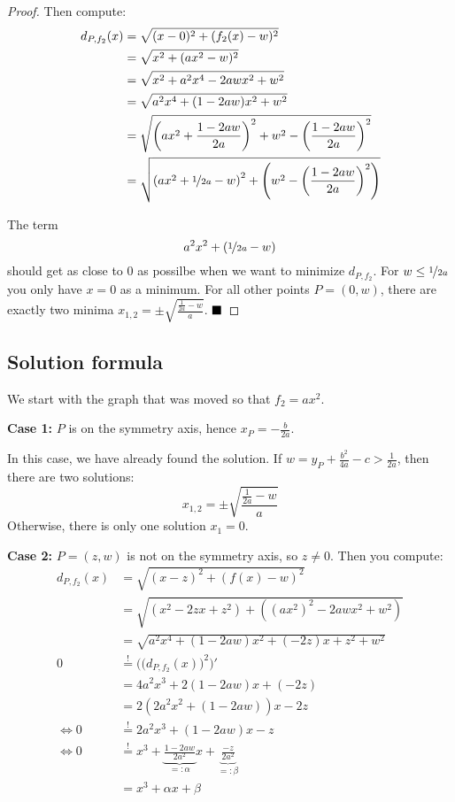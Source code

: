 \begin{proof}
Then compute:
\begin{align}
  d_{P,{f_2}}(x)  &= \sqrt{(x-0)^2 + (f_2(x)-w)^2}\\
    &= \sqrt{x^2 + (ax^2-w)^2}\\
    &= \sqrt{x^2 + a^2 x^4-2aw x^2+w^2}\\
    &= \sqrt{a^2 x^4 + (1-2aw) x^2 + w^2}\\
    &= \sqrt{\left (a x^2 + \frac{1-2 a w}{2a} \right )^2 + w^2 - \left (\frac{1-2 a w}{2a} \right )^2}\\
    &= \sqrt{\left (a x^2 + \nicefrac{1}{2a}- w \right )^2 + \left (w^2 - \left (\frac{1-2 a w}{2a} \right )^2 \right)}
\end{align}

The term 
\[a^2 x^2 + (\nicefrac{1}{2a}- w)\]
should get as close to $0$ as possilbe when we want to minimize 
$d_{P,{f_2}}$. For $w \leq \nicefrac{1}{2a}$ you only have $x = 0$ as a minimum.
For all other points $P = (0, w)$, there are exactly two minima $x_{1,2} = \pm \sqrt{\frac{\frac{1}{2a} - w}{a}}$.
$\qed$
\end{proof}

\subsection{Solution formula}
We start with the graph that was moved so that $f_2 = ax^2$.

\textbf{Case 1:} $P$ is on the symmetry axis, hence $x_P = - \frac{b}{2a}$.

In this case, we have already found the solution. If $w = y_P + \frac{b^2}{4a} - c > \frac{1}{2a}$,
then there are two solutions:
\[x_{1,2} = \pm \sqrt{\frac{\frac{1}{2a} - w}{a}}\]
Otherwise, there is only one solution $x_1 = 0$.

\textbf{Case 2:} $P = (z, w)$ is not on the symmetry axis, so $z \neq 0$. Then you compute:
\begin{align}
  d_{P,{f_2}}(x)  &= \sqrt{(x-z)^2 + (f(x)-w)^2}\\
    &= \sqrt{(x^2 - 2zx + z^2) + ((ax^2)^2 - 2 awx^2 + w^2)}\\
    &= \sqrt{a^2x^4 + (1- 2 aw)x^2 +(- 2z)x + z^2 + w^2}\\
  0 &\stackrel{!}{=} \Big(\big(d_{P, {f_2}}(x)\big)^2\Big)' \\
    &= 4a^2x^3 + 2(1- 2 aw)x +(- 2z)\\
    &= 2 \left (2a^2x^2 + (1- 2 aw) \right )x - 2z\\
    \Leftrightarrow 0 &\stackrel{!}{=} 2a^2x^3  + (1- 2 aw) x - z\\
\Leftrightarrow 0 &\stackrel{!}{=} x^3 + \underbrace{\frac{1- 2 aw}{2 a^2}}_{=: \alpha} x  + \underbrace{\frac{-z}{2 a^2}}_{=: \beta}\\
    &= x^3 + \alpha x + \beta\label{eq:simple-cubic-equation-for-quadratic-distance}
\end{align}

